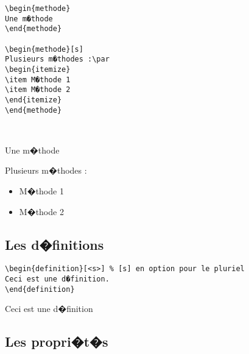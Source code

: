 \documentclass[ams,openany,10pt,presentation,latin1]{mathbook}
\begin{document}
\begin{minipage}{0.35\linewidth}
\begin{lstlisting}
\begin{methode}
Une m�thode
\end{methode}

\begin{methode}[s]
Plusieurs m�thodes :\par
\begin{itemize}
\item M�thode 1
\item M�thode 2
\end{itemize}
\end{methode}
\end{lstlisting}
\end{minipage}
\begin{minipage}{0.1\linewidth}
~\par
\end{minipage}
\begin{minipage}{0.45\linewidth}
\begin{methode}
Une m�thode
\end{methode}

\begin{methode}[s]
Plusieurs m�thodes :\par
\begin{itemize}
\item M�thode 1
\item M�thode 2
\end{itemize}
\end{methode}
\end{minipage}

\subsection{Les d�finitions}

\begin{lstlisting}
\begin{definition}[<s>] % [s] en option pour le pluriel
Ceci est une d�finition.
\end{definition}
\end{lstlisting}

\begin{definition}
Ceci est une d�finition
\end{definition}

\subsection{Les propri�t�s}
\end{document}
